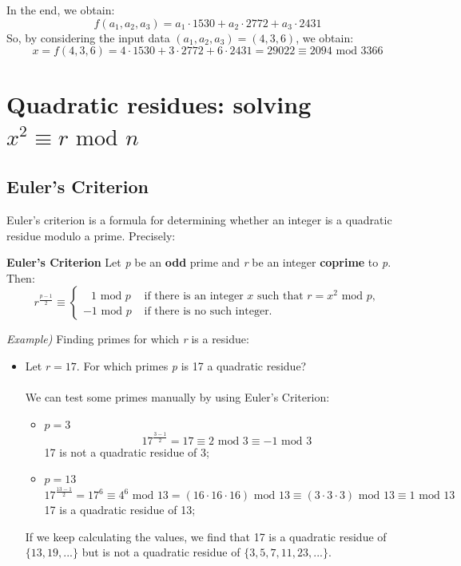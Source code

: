 \documentclass[11pt, a4paper]{article}
\newcommand{\mymod}{
    \text{ mod }
}
\begin{document}
In the end, we obtain:
$$f(a_1,a_2,a_3)=a_1\cdot1530+a_2\cdot2772+a_3\cdot2431$$
So, by considering the input data $(a_1,a_2,a_3)=(4,3,6)$, we obtain:
$$x=f(4,3,6)=4\cdot1530+3\cdot2772+6\cdot2431=29022\equiv2094\mymod3366$$

\newpage
\section{Quadratic residues: solving $x^2\equiv r\mymod n$}
\subsection{Euler's Criterion}
Euler's criterion is a formula for determining whether an integer is a quadratic residue modulo a prime. Precisely:
\begin{framed}
\hfill\break\textbf{Euler's Criterion} Let \textit{p} be an \textbf{odd} prime and \textit{r} be an integer \textbf{coprime} to \textit{p}. Then:
\begin{equation*}
    r^{\tfrac{p-1}{2}}\equiv
    \begin{cases}
        \;\;\,1{\mymod p}&{\text{ if there is an integer }}x{\text{ such that }}r=x^{2}{\mymod p},\\
        -1{\mymod p}&{\text{ if there is no such integer.}}
    \end{cases}
\end{equation*}
\end{framed}\hfill\break
\textit{Example)} Finding primes for which \textit{r} is a residue:
\begin{itemize}
    \item[] Let $r=17$. For which primes \textit{p} is 17 a quadratic residue?\\\\
    We can test some primes manually by using Euler's Criterion:
    \begin{itemize}
        \item $p=3$
        $$\displaystyle 17^{\tfrac{3-1}{2}}=17\equiv 2\mymod3\equiv-1\mymod3$$
        17 is not a quadratic residue of 3;
        \item $p=13$
        $$\displaystyle 17^{\tfrac{13-1}{2}}=17^6\equiv4^6\mymod13=(16\cdot16\cdot16)\mymod13\equiv(3\cdot3\cdot3)\mymod13\equiv1\mymod13$$
        17 is a quadratic residue of 13;
    \end{itemize}
    If we keep calculating the values, we find that 17 is a quadratic residue of $\{13,19,...\}$ but is not a quadratic residue of $\{3,5,7,11,23,...\}$.
\end{itemize}
\end{document}
